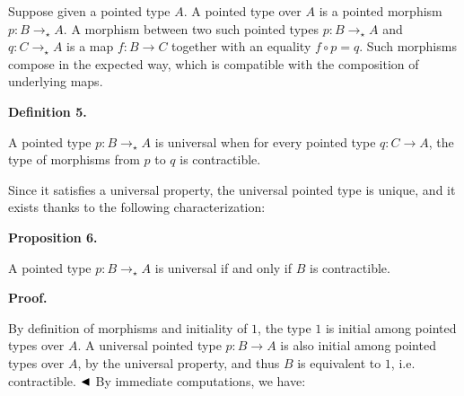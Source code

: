 \documentclass[10pt,a4paper]{article}
\begin{document}
 
 
Suppose given a pointed type $A$. A pointed type over $A$ is a pointed morphism $p:B\to_{\star{}}A$. A morphism between two such pointed types $p:B\to_{\star{}}A$ and $q:C\to_{\star{}}A$ is a map $f:B\to C$ together with an equality $f\circ p=q$. Such morphisms compose in the expected way, which is compatible with the composition of underlying maps.\par
 
 
 
\par\medskip\noindent\textbf{Definition 5.}\par
 
 
A pointed type $p:B\to_{\star{}}A$ is universal when for every pointed type $q:C\to A$, the type of morphisms from $p$ to $q$ is contractible.\par
 
 
 
 
Since it satisfies a universal property, the universal pointed type is unique, and it exists thanks to the following characterization:\par
 
 
 
\par\medskip\noindent\textbf{Proposition 6.}\par
 
 
A pointed type $p:B\to_{\star{}}A$ is universal if and only if $B$ is contractible.\par
 
 
 
 
\par\medskip\noindent\textbf{Proof.}\par
 
 
By definition of morphisms and initiality of $1$, the type $1$ is initial among pointed types over $A$. A universal pointed type $p:B\to A$ is also initial among pointed types over $A$, by the universal property, and thus $B$ is equivalent to $1$, i.e. contractible. $\hfill\blacktriangleleft$ By immediate computations, we have:\par
 
\end{document}
